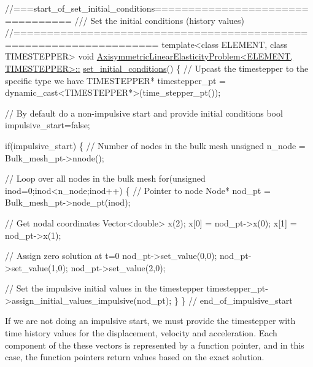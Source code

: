  
\begin{DoxyCodeInclude}
\textcolor{comment}{//===start\_of\_set\_initial\_conditions=================================}
\textcolor{comment}{/// Set the initial conditions (history values)}
\textcolor{comment}{}\textcolor{comment}{//===================================================================}
\textcolor{keyword}{template}<\textcolor{keyword}{class} ELEMENT, \textcolor{keyword}{class} TIMESTEPPER>
\textcolor{keywordtype}{void} \hyperlink{classAxisymmetricLinearElasticityProblem_a6b0263b6f783652a1d8151948f4b9430}{AxisymmetricLinearElasticityProblem<ELEMENT, TIMESTEPPER>::}
\hyperlink{classAxisymmetricLinearElasticityProblem_a6b0263b6f783652a1d8151948f4b9430}{set\_initial\_conditions}()
\{
 \textcolor{comment}{// Upcast the timestepper to the specific type we have}
 TIMESTEPPER* timestepper\_pt =
  \textcolor{keyword}{dynamic\_cast<}TIMESTEPPER*\textcolor{keyword}{>}(time\_stepper\_pt());

 \textcolor{comment}{// By default do a non-impulsive start and provide initial conditions}
 \textcolor{keywordtype}{bool} impulsive\_start=\textcolor{keyword}{false};

 \textcolor{keywordflow}{if}(impulsive\_start)
  \{
   \textcolor{comment}{// Number of nodes in the bulk mesh}
   \textcolor{keywordtype}{unsigned} n\_node = Bulk\_mesh\_pt->nnode();

   \textcolor{comment}{// Loop over all nodes in the bulk mesh}
   \textcolor{keywordflow}{for}(\textcolor{keywordtype}{unsigned} inod=0;inod<n\_node;inod++)
    \{
     \textcolor{comment}{// Pointer to node}
     Node* nod\_pt = Bulk\_mesh\_pt->node\_pt(inod);

     \textcolor{comment}{// Get nodal coordinates}
     Vector<double> x(2);
     x[0] = nod\_pt->x(0);
     x[1] = nod\_pt->x(1);

     \textcolor{comment}{// Assign zero solution at t=0}
     nod\_pt->set\_value(0,0);
     nod\_pt->set\_value(1,0);
     nod\_pt->set\_value(2,0);

     \textcolor{comment}{// Set the impulsive initial values in the timestepper}
     timestepper\_pt->assign\_initial\_values\_impulsive(nod\_pt);
    \}
  \} \textcolor{comment}{// end\_of\_impulsive\_start}

\end{DoxyCodeInclude}


If we are not doing an impulsive start, we must provide the timestepper with time history values for the displacement, velocity and acceleration. Each component of the these vectors is represented by a function pointer, and in this case, the function pointers return values based on the exact solution.


